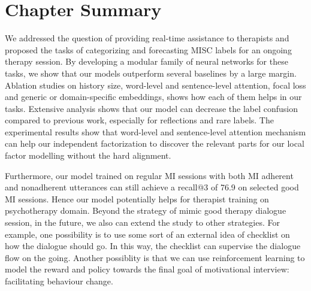 \section{Chapter Summary}
\label{sec:snt:conclusion}

We addressed the question of providing real-time assistance to
therapists and proposed the tasks of categorizing and forecasting MISC
labels for an ongoing therapy session. By developing a modular family
of neural networks for these tasks, we show that our models outperform
several baselines by a large margin.  Ablation studies on history
size, word-level and sentence-level attention, focal loss and generic
or domain-specific embeddings, shows how each of them helps in our
tasks. Extensive analysis shows that our model can decrease the label
confusion compared to previous work, especially for reflections and
rare labels. The experimental results show that word-level and sentence-level attention
mechanism can help our independent factorization to discover the
relevant parts for our local factor modelling without the hard
alignment.

Furthermore, our model trained on regular MI sessions with both MI
adherent and nonadherent utterances can still achieve a recall@3 of
76.9 on selected good MI sessions. Hence our model potentially helps
for therapist training on psychotherapy domain. Beyond the strategy of
mimic good therapy dialogue session, in the future, we also can extend
the study to other strategies. For example, one possibility is to use
some sort of an external idea of checklist on how the dialogue should
go. In this way, the checklist can supervise the dialogue flow on the
going. Another possiblity is that we can use reinforcement learning to
model the reward and policy towards the final goal of motivational
interview: facilitating behaviour change.

